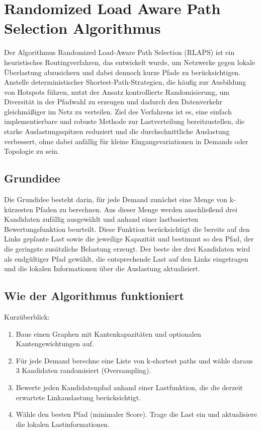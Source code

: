 \chapter{Randomized Load Aware Path Selection Algorithmus}
\label{chapter:algorithmus2}
\graphicspath{{../bilder/}}

Der Algorithmus Randomized Load-Aware Path Selection (RLAPS) ist ein heuristisches Routingverfahren, das entwickelt wurde, um Netzwerke gegen lokale Überlastung abzusichern und dabei dennoch kurze Pfade zu berücksichtigen. Anstelle deterministischer Shortest-Path-Strategien, die häufig zur Ausbildung von Hotspots führen, nutzt der Ansatz kontrollierte Randomisierung, um Diversität in der Pfadwahl zu erzeugen und dadurch den Datenverkehr gleichmäßiger im Netz zu verteilen. Ziel des Verfahrens ist es, eine einfach implementierbare und robuste Methode zur Lastverteilung bereitzustellen, die starke Auslastungsspitzen reduziert und die durchschnittliche Auslastung verbessert, ohne dabei anfällig für kleine Eingangsvariationen in Demands oder Topologie zu sein.

\section{Grundidee}

Die Grundidee besteht darin, für jede Demand zunächst eine Menge von k-kürzesten Pfaden zu berechnen. Aus dieser Menge werden anschließend drei Kandidaten zufällig ausgewählt und anhand einer lastbasierten Bewertungsfunktion beurteilt. Diese Funktion berücksichtigt die bereits auf den Links geplante Last sowie die jeweilige Kapazität und bestimmt so den Pfad, der die geringste zusätzliche Belastung erzeugt. Der beste der drei Kandidaten wird als endgültiger Pfad gewählt, die entsprechende Last auf den Links eingetragen und die lokalen Informationen über die Auslastung aktualisiert.

\section{Wie der Algorithmus funktioniert}

Kurzüberblick:

\begin{enumerate}
    \item Baue einen Graphen mit Kantenkapazitäten und optionalen Kantengewichtungen auf.
    \item Für jede Demand berechne eine Liste von k-shortest paths und wähle daraus 3 Kandidaten randomisiert (Oversampling).
    \item Bewerte jeden Kandidatenpfad anhand einer Lastfunktion, die die derzeit erwartete Linkauslastung berücksichtigt.
    \item Wähle den besten Pfad (minimaler Score). Trage die Last ein und aktualisiere die lokalen Lastinformationen.
\end{enumerate}

